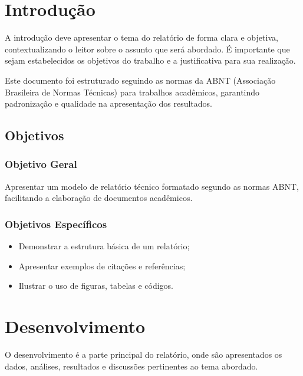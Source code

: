\documentclass{classes/relatorio}
\begin{document}


\section{Introdução}

A introdução deve apresentar o tema do relatório de forma clara e objetiva, contextualizando o leitor sobre o assunto que será abordado. É importante que sejam estabelecidos os objetivos do trabalho e a justificativa para sua realização.

Este documento foi estruturado seguindo as normas da ABNT (Associação Brasileira de Normas Técnicas) para trabalhos acadêmicos, garantindo padronização e qualidade na apresentação dos resultados.

\subsection{Objetivos}

\subsubsection{Objetivo Geral}

Apresentar um modelo de relatório técnico formatado segundo as normas ABNT, facilitando a elaboração de documentos acadêmicos.

\subsubsection{Objetivos Específicos}

\begin{itemize}
    \item Demonstrar a estrutura básica de um relatório;
    \item Apresentar exemplos de citações e referências;
    \item Ilustrar o uso de figuras, tabelas e códigos.
\end{itemize}

\section{Desenvolvimento}

O desenvolvimento é a parte principal do relatório, onde são apresentados os dados, análises, resultados e discussões pertinentes ao tema abordado.
\end{document}
